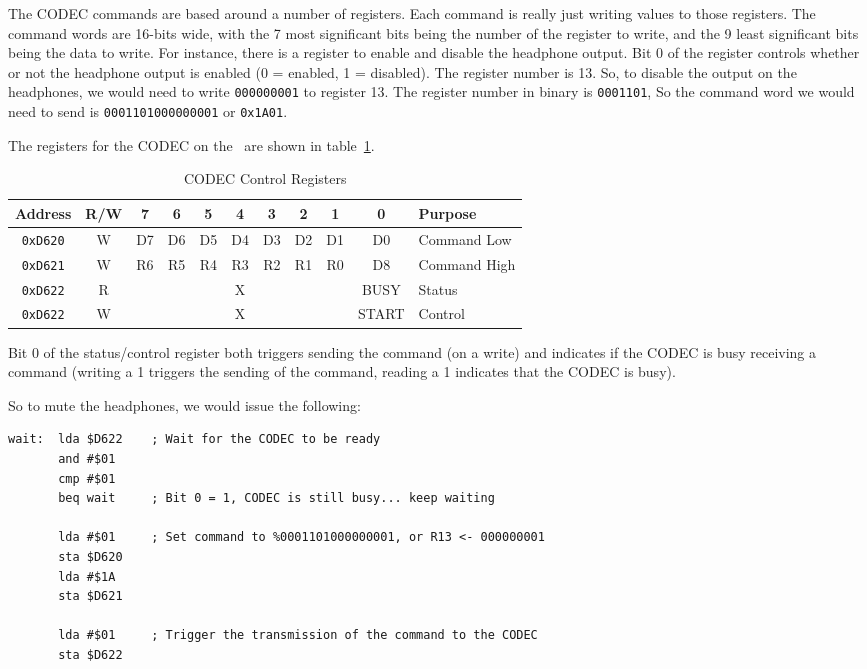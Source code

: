 The CODEC commands are based around a number of registers. Each command is really just writing values to those registers. The command words are 16-bits wide, with the 7 most significant bits being the number of the register to write, and the 9 least significant bits being the data to write. For instance, there is a register to enable and disable the headphone output. Bit 0 of the register controls whether or not the headphone output is enabled (0 = enabled, 1 = disabled). The register number is 13. So, to disable the output on the headphones, we would need to write \verb+000000001+ to register 13. The register number in binary is \verb+0001101+, So the command word we would need to send is \verb+0001101000000001+ or \verb+0x1A01+.

The registers for the CODEC on the \jr\ are shown in table~\ref{tab:codec_registers}.

\begin{table}[ht]
	\begin{center}
		\begin{tabular}{|c|c|c|c|c|c|c|c|c|c|l|} \hline
			Address & R/W & 7 & 6 & 5 & 4 & 3 & 2 & 1 & 0 & Purpose \\ \hline \hline
			\verb+0xD620+ & W & D7 & D6 & D5 & D4 & D3 & D2 & D1 & D0 & Command Low \\ \hline
			\verb+0xD621+ & W & R6 & R5 & R4 & R3 & R2 & R1 & R0 & D8 & Command High \\ \hline
			\verb+0xD622+ & R & \multicolumn{7}{|c|}{X} & BUSY & Status \\ \hline
			\verb+0xD622+ & W & \multicolumn{7}{|c|}{X} & START & Control \\ \hline
		\end{tabular}
	\end{center}
	\caption{CODEC Control Registers}
	\label{tab:codec_registers}
\end{table}

Bit 0 of the status/control register both triggers sending the command (on a write) and indicates if the CODEC is busy receiving a command (writing a 1 triggers the sending of the command, reading a 1 indicates that the CODEC is busy).

So to mute the headphones, we would issue the following:

\begin{verbatim}
wait:  lda $D622    ; Wait for the CODEC to be ready
       and #$01
       cmp #$01
       beq wait     ; Bit 0 = 1, CODEC is still busy... keep waiting

       lda #$01     ; Set command to %0001101000000001, or R13 <- 000000001
       sta $D620
       lda #$1A
       sta $D621

       lda #$01     ; Trigger the transmission of the command to the CODEC
       sta $D622
\end{verbatim}

